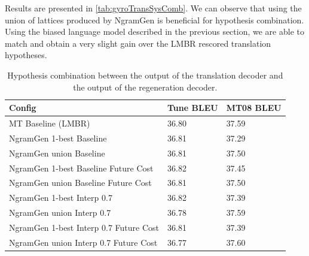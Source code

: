 Results are presented in \autoref{tab:gyroTransSysComb}.
We can observe that using the union of lattices produced
by NgramGen is beneficial for hypothesis combination.
Using the biased language model described in the
previous section, we are able to match and obtain
a very slight gain over the LMBR rescored translation
hypotheses.
\begin{table}
  \begin{center}
    \begin{tabular}{l|l|l}
      Config & Tune BLEU & MT08 BLEU \\
      \hline
      MT Baseline (LMBR) & 36.80 & 37.59 \\
      \hline
      NgramGen 1-best Baseline &  36.81 & 37.29 \\
      NgramGen union Baseline & 36.81 & 37.50 \\
      \hline
      NgramGen 1-best Baseline Future Cost & 36.82 & 37.45 \\
      NgramGen union Baseline Future Cost & 36.81 & 37.50 \\
      \hline
      NgramGen 1-best Interp 0.7 & 36.82 & 37.39 \\
      NgramGen union Interp 0.7 & 36.78 & 37.59 \\
      \hline
      NgramGen 1-best Interp 0.7 Future Cost & 36.81 & 37.39 \\
      NgramGen union Interp 0.7 Future Cost & 36.77 & 37.60 \\
    \end{tabular}
    \caption{Hypothesis combination between the output of the translation
    decoder and the output of the regeneration decoder.}
    \label{tab:gyroTransSysComb}
  \end{center}
\end{table}



